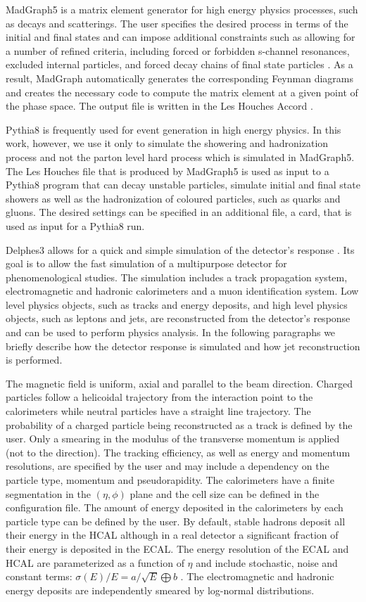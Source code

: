 MadGraph5 is a matrix element generator for high energy physics processes, such as decays and scatterings. The user specifies the desired process in terms of the initial and final states and can impose additional constraints such as allowing for a number of refined criteria, including forced or forbidden s-channel resonances, excluded internal particles, and forced decay chains of final state particles \cite{MG5}. As a result, MadGraph automatically generates the corresponding Feynman diagrams and creates the necessary code to compute the matrix element at a given point of the phase space. The output file is written in the Les Houches Accord \cite{lhe}.

Pythia8 is frequently used for event generation in high energy physics. In this work, however, we use it only to simulate the showering and hadronization process and not the parton level hard process which is simulated in MadGraph5. The Les Houches file that is produced by MadGraph5 is used as input to a Pythia8 program that can decay unstable particles, simulate initial and final state showers as well as the hadronization of coloured particles, such as quarks and gluons. The desired settings can be specified in an additional file, a card, that is used as input for a Pythia8 run.

Delphes3 allows for a quick and simple simulation of the detector's response \cite{Delphes}. Its goal is to allow the fast simulation of a multipurpose detector for phenomenological studies. The simulation includes a track propagation system, electromagnetic and hadronic calorimeters and a muon identification system. Low level physics objects, such as tracks and energy deposits, and high level physics objects, such as leptons and jets, are reconstructed from the detector's response and can be used to perform physics analysis. In the following paragraphs we briefly describe how the detector response is simulated and how jet reconstruction is performed.  

The magnetic field is uniform, axial and parallel to the beam direction. Charged particles follow a helicoidal trajectory from the interaction point to the calorimeters while neutral particles have a straight line trajectory. The probability of a charged particle being reconstructed as a track is defined by the user. Only a smearing in the modulus of the transverse momentum is applied (not to the direction). The tracking efficiency, as well as energy and momentum resolutions, are specified by the user and may include a dependency on the particle type, momentum and pseudorapidity. The calorimeters have a finite segmentation in the $(\eta,\phi)$ plane and the cell size can be defined in the configuration file. The amount of energy deposited in the calorimeters by each particle type can be defined by the user. By default, stable hadrons deposit all their energy in the HCAL although in a real detector a significant fraction of their energy is deposited in the ECAL. The energy resolution of the ECAL and HCAL are parameterized as a function of $\eta$ and include stochastic, noise and constant terms: $\sigma (E)/E=a/\sqrt{E}\bigoplus b$ . The electromagnetic and hadronic energy deposits are independently smeared by log-normal distributions. 

